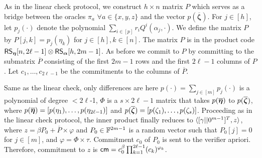  As in the linear check protocol, we
construct $h\times n$ matrix $P$ which serves as a bridge between the oracles
$\pi_a$ $\forall a \in \{x,y,z\}$ and the vector $p(\overline{\bm{\zeta}})$.
For $j\in [h]$, let $p_j(\cdot)$ denote the polynomial $\sum_{i\in[p]}
r_iQ^i(\alpha_j, \cdot)$. We define the matrix $P$ by $P[j,k]= p_j(\eta_k)$ for
$j\in[h], k\in[n]$. The matrix $P$ is in the product code $\mathsf{RS}_{\bm{\eta}}[n,2\ell-1]\otimes \mathsf{RS}_{\bm{\alpha}}[h,2m-1]$. As
before we commit to $P$ by committing to the submatrix $\overline{P}$
consisting of the first $2m-1$ rows and the first $2\ell-1$ columns of $P$. Let
$c_1,\ldots,c_{2\ell-1}$ be the commitments to the columns of $\overline{P}$.


 Same as the linear check, only differences are here $p(\cdot) = \sum_{j\in[m]}p_j(\cdot)$ is a polynomial of degree $<2\ell$-1, $\Phi$ is a $s \times 2\ell -1$ matrix that takes $p(\overline{\bm{\eta}})$ to $p(\overline{\bm{\zeta}})$, where $p(\overline{\bm{\eta}}) = [p(\eta_1),\ldots, p(\eta_{2\ell-1})]$ and $p(\overline{\bm{\zeta}}) = [p(\zeta_1),\ldots, p(\zeta_{s})]$.  
Proceeding as in the linear check protocol, the inner product finally reduces to
$\langle [\gamma||0^{m-1}]^T,z\rangle$, where $z= \beta P_0 + \overline{P}\times
\varphi$ and $P_0\in \mathbb{F}^{2m-1}$ is a random vector such that $P_0[j]=0$ for
$j\in [m]$, and $\varphi = \Phi\times \tau$. Commitment $c_0$ of $P_0$ is sent to the verifier apriori. Therefore, commitment to $z$ is $\mathsf{cm} = c_0^{\beta}\prod_{k=1}^{2\ell-1}(c_k)^{\varphi_k}$.

\begin{comment} 
Let$\overline{\bm{\eta}}$ denote the vector $(\eta_1, \ldots, \eta_{2\ell})$, and
let $\Phi$ denote the $s\times 2\ell$ matrix such that
$p(\overline{\bm{\zeta}}) = \Phi p(\overline{\bm{\eta}})$. Observe
that $p(\overline{\bm{\eta}}) = \overline{P}^T [\gamma||0^m]^T$ and thus
$p(\zetabar) = \Phi \overline{P}^T [\gamma||0^m]^T$. Now we have
$\innp{\tau}{p(\zetabar)} = p(\zetabar)^T \tau = [\gamma||0^m] \overline{P}
\Phi^T \tau = \innp{[\gamma||0^m]^T}{\overline{P}\varphi}$ where $\varphi =
\Phi^T \tau$. Given commitments $c_1, \ldots, c_{2\ell}$, the commitment to
$\overline{P}\varphi$ can be computed as $\cm = \prod_{k\in[2\ell]} (c_k)^{\varphi_k}$. Using an inner product argument the prover can show that the commitment
$\cm$ opens to vector $z$ such that $\innp{[\gamma||0^m]^T}{z} = 0$. Binding
property of the commitment ensures that $z = \overline{P}\varphi$ with
overwhelming probability.
As in the linear check, the prover uses a random vector $P_0\in \FF^{2m}$ such
that $P_0[j]=0$ for $j\in [m]$ to blind the vector $\overline{P}\varphi$. The
prover initially commits to $P_0$ by sending a commitment $c_0$ to it, and later
sends uses the vector $z=\beta P_0 + \overline{P}\varphi$ in the preceeding
inner product check.
\end{comment}

